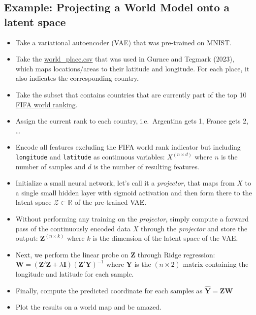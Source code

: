 \documentclass[
  letterpaper,
  DIV=11,
  numbers=noendperiod]{scrartcl}
\author{}
\date{}
\providecommand{\tightlist}{%
  \setlength{\itemsep}{0pt}\setlength{\parskip}{0pt}}\usepackage{longtable,booktabs,array}
\begin{document}
\ifdefined\Shaded\renewenvironment{Shaded}{\begin{tcolorbox}[interior hidden, breakable, sharp corners, borderline west={3pt}{0pt}{shadecolor}, boxrule=0pt, enhanced, frame hidden]}{\end{tcolorbox}}\fi

\hypertarget{example-projecting-a-world-model-onto-a-latent-space}{%
\subsection{Example: Projecting a World Model onto a latent
space}\label{example-projecting-a-world-model-onto-a-latent-space}}

\begin{itemize}
\tightlist
\item
  Take a variational autoencoder (VAE) that was pre-trained on MNIST.
\item
  Take the
  \href{https://github.com/wesg52/world-models/blob/main/data/entity_datasets/world_place.csv}{world\_place.csv}
  that was used in Gurnee and Tegmark (2023), which maps locations/areas
  to their latitude and longitude. For each place, it also indicates the
  corresponding country.
\item
  Take the subset that contains countries that are currently part of the
  top 10
  \href{https://www.fifa.com/fifa-world-ranking/men?dateId=id14142}{FIFA
  world ranking}.
\item
  Assign the current rank to each country, i.e.~Argentina gets 1, France
  gets 2, \ldots{}
\item
  Encode all features excluding the FIFA world rank indicator but
  including \texttt{longitude} and \texttt{latitude} as continuous
  variables: \(X^{(n \times d)}\) where \(n\) is the number of samples
  and \(d\) is the number of resulting features.
\item
  Initialize a small neural network, let's call it a \emph{projector},
  that maps from \(X\) to a single small hidden layer with sigmoid
  activation and then form there to the latent space
  \(\mathcal{Z} \subset \mathbb{R}\) of the pre-trained VAE.
\item
  Without performing any training on the \emph{projector}, simply
  compute a forward pass of the continuously encoded data \(X\) through
  the \emph{projector} and store the output:
  \(\mathbf{Z}^{(n \times k)}\) where \(k\) is the dimension of the
  latent space of the VAE.
\item
  Next, we perform the linear probe on \(\mathbf{Z}\) through Ridge
  regression:
  \(\mathbf{W} = (\mathbf{Z}'\mathbf{Z} + \lambda \mathbf{I}) (\mathbf{Z}'\mathbf{Y})^{-1}\)
  where \(\mathbf{Y}\) is the \((n \times 2)\) matrix containing the
  longitude and latitude for each sample.
\item
  Finally, compute the predicted coordinate for each samples as
  \(\widehat{\mathbf{Y}}=\mathbf{Z}\mathbf{W}\)
\item
  Plot the results on a world map and be amazed.
\end{itemize}
\end{document}
